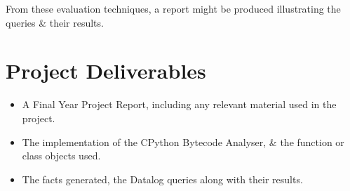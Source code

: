 \documentclass[12pt, a4paper]{report}
\theoremstyle{definition}
\theoremstyle{definition}%
\theoremstyle{definition}%
\theoremstyle{definition}%
\theoremstyle{definition}%
\theoremstyle{definition}%
\begin{document}
    From these evaluation techniques, a report might be produced illustrating the queries \& their results.

\chapter{Project Deliverables}

    \begin{itemize}
        \item A Final Year Project Report, including any relevant material used in the project.
        \item The implementation of the CPython Bytecode Analyser, \& the function or class objects used.
        \item The facts generated, the Datalog queries along with their results.
    \end{itemize}

\bibliomatter




    
        
\end{document}
